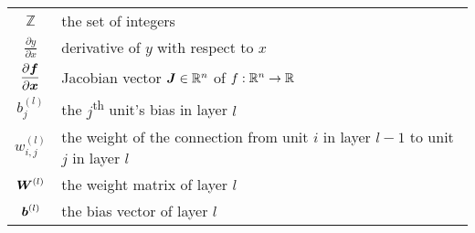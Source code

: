 \documentclass[../report.tex]{subfiles}
\begin{document}
\begin{tabular}{cl}
    $\displaystyle \mathbb{Z}$ & the set of integers\\
    $\displaystyle \frac{\partial y}{\partial x}$ & derivative of $y$ with respect to $x$\\
    $\displaystyle \frac{\partial {\bm{f}}}{\partial {\bm{x}}}$ & Jacobian vector ${\bm{J}}\in \mathbb{R}^n$ of $f:\mathbb{R}^n\to\mathbb{R}$\\
    $\displaystyle b_j^{(l)}$ & the $j$\textsuperscript{th} unit's bias in layer $l$\\
    $\displaystyle w_{i,j}^{(l)}$ & the weight of the connection from unit $i$ in layer $l-1$ to unit $j$ in layer $l$\\
    $\displaystyle {\bm{W}}^{(l)}$ & the weight matrix of layer $l$\\
    $\displaystyle {\bm{b}}^{(l)}$ & the bias vector of layer $l$
\end{tabular}
\end{document}
